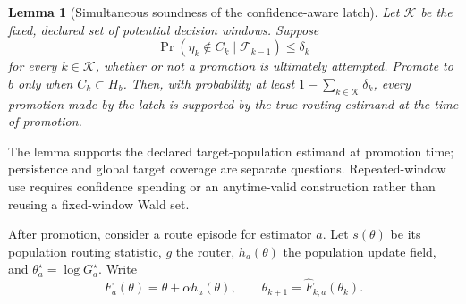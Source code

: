 \documentclass[11pt]{article}
\theoremstyle{plain}
\newtheorem{lemma}[theorem]{Lemma}
\theoremstyle{definition}
\theoremstyle{remark}
\begin{document}
\begin{lemma}[Simultaneous soundness of the confidence-aware latch]\label{lem:latch}
Let $\mathcal K$ be the fixed, declared set of potential decision windows.
Suppose
\[
  \Pr(\eta_k\notin C_k\mid\mathcal F_{k-1})\le\delta_k
\]
for every $k\in\mathcal K$, whether or not a promotion is ultimately attempted.
Promote to $b$ only when $C_k\subset H_b$. Then, with probability at least
$1-\sum_{k\in\mathcal K}\delta_k$, every promotion made by the latch is
supported by the true routing estimand at the time of promotion.
\end{lemma}

The lemma supports the declared target-population estimand at promotion time;
persistence and global target coverage are separate questions. Repeated-window
use requires confidence spending or an anytime-valid construction rather than
reusing a fixed-window Wald set.

After promotion, consider a route episode for estimator $a$. Let $s(\theta)$ be its
population routing statistic, $g$ the router, $h_a(\theta)$ the population
update field, and $\theta_a^\star=\log G_a^\star$. Write
\begin{equation}
  F_a(\theta)=\theta+\alpha h_a(\theta),\qquad
  \theta_{k+1}=\widehat F_{k,a}(\theta_k).                    \label{eq:update}
\end{equation}
\end{document}
